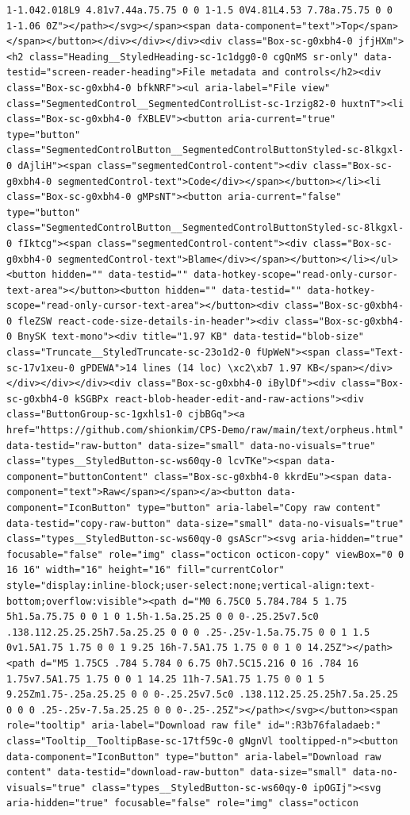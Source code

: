\documentclass[
  letterpaper,
]{book}
\begin{document}
\begin{verbatim}
1-1.042.018L9 4.81v7.44a.75.75 0 0 1-1.5 0V4.81L4.53 7.78a.75.75 0 0 1-1.06 0Z"></path></svg></span><span data-component="text">Top</span></span></button></div></div></div><div class="Box-sc-g0xbh4-0 jfjHXm"><h2 class="Heading__StyledHeading-sc-1c1dgg0-0 cgQnMS sr-only" data-testid="screen-reader-heading">File metadata and controls</h2><div class="Box-sc-g0xbh4-0 bfkNRF"><ul aria-label="File view" class="SegmentedControl__SegmentedControlList-sc-1rzig82-0 huxtnT"><li class="Box-sc-g0xbh4-0 fXBLEV"><button aria-current="true" type="button" class="SegmentedControlButton__SegmentedControlButtonStyled-sc-8lkgxl-0 dAjliH"><span class="segmentedControl-content"><div class="Box-sc-g0xbh4-0 segmentedControl-text">Code</div></span></button></li><li class="Box-sc-g0xbh4-0 gMPsNT"><button aria-current="false" type="button" class="SegmentedControlButton__SegmentedControlButtonStyled-sc-8lkgxl-0 fIktcg"><span class="segmentedControl-content"><div class="Box-sc-g0xbh4-0 segmentedControl-text">Blame</div></span></button></li></ul><button hidden="" data-testid="" data-hotkey-scope="read-only-cursor-text-area"></button><button hidden="" data-testid="" data-hotkey-scope="read-only-cursor-text-area"></button><div class="Box-sc-g0xbh4-0 fleZSW react-code-size-details-in-header"><div class="Box-sc-g0xbh4-0 BnySK text-mono"><div title="1.97 KB" data-testid="blob-size" class="Truncate__StyledTruncate-sc-23o1d2-0 fUpWeN"><span class="Text-sc-17v1xeu-0 gPDEWA">14 lines (14 loc) \xc2\xb7 1.97 KB</span></div></div></div></div><div class="Box-sc-g0xbh4-0 iBylDf"><div class="Box-sc-g0xbh4-0 kSGBPx react-blob-header-edit-and-raw-actions"><div class="ButtonGroup-sc-1gxhls1-0 cjbBGq"><a href="https://github.com/shionkim/CPS-Demo/raw/main/text/orpheus.html" data-testid="raw-button" data-size="small" data-no-visuals="true" class="types__StyledButton-sc-ws60qy-0 lcvTKe"><span data-component="buttonContent" class="Box-sc-g0xbh4-0 kkrdEu"><span data-component="text">Raw</span></span></a><button data-component="IconButton" type="button" aria-label="Copy raw content" data-testid="copy-raw-button" data-size="small" data-no-visuals="true" class="types__StyledButton-sc-ws60qy-0 gsAScr"><svg aria-hidden="true" focusable="false" role="img" class="octicon octicon-copy" viewBox="0 0 16 16" width="16" height="16" fill="currentColor" style="display:inline-block;user-select:none;vertical-align:text-bottom;overflow:visible"><path d="M0 6.75C0 5.784.784 5 1.75 5h1.5a.75.75 0 0 1 0 1.5h-1.5a.25.25 0 0 0-.25.25v7.5c0 .138.112.25.25.25h7.5a.25.25 0 0 0 .25-.25v-1.5a.75.75 0 0 1 1.5 0v1.5A1.75 1.75 0 0 1 9.25 16h-7.5A1.75 1.75 0 0 1 0 14.25Z"></path><path d="M5 1.75C5 .784 5.784 0 6.75 0h7.5C15.216 0 16 .784 16 1.75v7.5A1.75 1.75 0 0 1 14.25 11h-7.5A1.75 1.75 0 0 1 5 9.25Zm1.75-.25a.25.25 0 0 0-.25.25v7.5c0 .138.112.25.25.25h7.5a.25.25 0 0 0 .25-.25v-7.5a.25.25 0 0 0-.25-.25Z"></path></svg></button><span role="tooltip" aria-label="Download raw file" id=":R3b76faladaeb:" class="Tooltip__TooltipBase-sc-17tf59c-0 gNgnVl tooltipped-n"><button data-component="IconButton" type="button" aria-label="Download raw content" data-testid="download-raw-button" data-size="small" data-no-visuals="true" class="types__StyledButton-sc-ws60qy-0 ipOGIj"><svg aria-hidden="true" focusable="false" role="img" class="octicon 
\end{verbatim}
\end{document}
